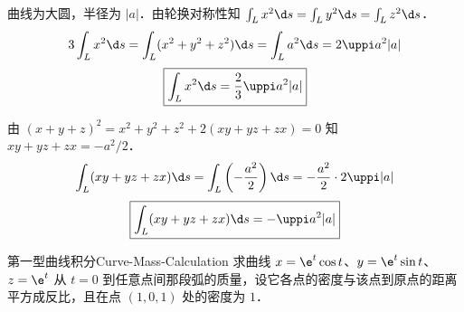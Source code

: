 \begin{solution}
    曲线为大圆，半径为 $|a|$．由轮换对称性知 $\int_{L} x^{2} \d s = \int_{L} y^{2} \d s = \int_{L} z^{2} \d s$．
    \begin{equation}
        3 \int_{L} x^{2} \d s = \int_{L}(x^{2}+y^{2}+z^{2}) \d s = \int_{L} a^{2} \d s = 2 \uppi a^{2} |a|
    \end{equation}
    \begin{equation}
        \boxed{\int_{L} x^{2} \d s = \frac{2}{3} \uppi a^{2} |a|}
    \end{equation}


    由 $(x+y+z)^{2} = x^{2}+y^{2}+z^{2} + 2(xy+yz+zx) = 0$ 知 $xy+yz+zx = -a^{2}/2$．
    \begin{equation}
        \int_{L}(xy+yz+zx) \d s = \int_{L} \left( -\frac{a^{2}}{2} \right) \d s = -\frac{a^{2}}{2} \cdot 2 \uppi |a|
    \end{equation}
    \begin{equation}
        \boxed{\int_{L}(xy+yz+zx) \d s = - \uppi a^{2} |a|}
    \end{equation}
\end{solution}

\begin{problem}{第一型曲线积分}{Curve-Mass-Calculation}
    求曲线 $x = \e^t \cos t$、$y = \e^t \sin t$、$z = \e^t$ 从 $t = 0$ 到任意点间那段弧的质量，设它各点的密度与该点到原点的距离平方成反比，且在点 $(1, 0, 1)$ 处的密度为 $1$．
\end{problem}

